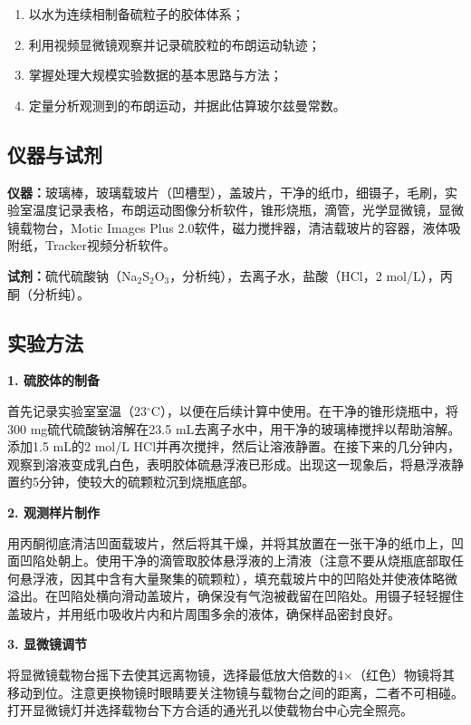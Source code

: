 \documentclass[a4paper]{article}
\begin{document}
\begin{enumerate}[label=\arabic*.,leftmargin=2em]
	\item 以水为连续相制备硫粒子的胶体体系；
	\item 利用视频显微镜观察并记录硫胶粒的布朗运动轨迹；
	\item 掌握处理大规模实验数据的基本思路与方法；
	\item 定量分析观测到的布朗运动，并据此估算玻尔兹曼常数。
\end{enumerate}

\subsection{仪器与试剂}

\textbf{仪器：}玻璃棒，玻璃载玻片（凹槽型），盖玻片，干净的纸巾，细镊子，毛刷，实验室温度记录表格，布朗运动图像分析软件，锥形烧瓶，滴管，光学显微镜，显微镜载物台，Motic Images Plus 2.0软件，磁力搅拌器，清洁载玻片的容器，液体吸附纸，Tracker视频分析软件。

\textbf{试剂：}硫代硫酸钠（Na$_2$S$_2$O$_3$，分析纯），去离子水，盐酸（HCl，2 mol/L），丙酮（分析纯）。

\subsection{实验方法}

\textbf{1. 硫胶体的制备}

首先记录实验室室温（23$^\circ$C），以便在后续计算中使用。在干净的锥形烧瓶中，将300 mg硫代硫酸钠溶解在23.5 mL去离子水中，用干净的玻璃棒搅拌以帮助溶解。添加1.5 mL的2 mol/L HCl并再次搅拌，然后让溶液静置。在接下来的几分钟内，观察到溶液变成乳白色，表明胶体硫悬浮液已形成。出现这一现象后，将悬浮液静置约5分钟，使较大的硫颗粒沉到烧瓶底部。

\textbf{2. 观测样片制作}

用丙酮彻底清洁凹面载玻片，然后将其干燥，并将其放置在一张干净的纸巾上，凹面凹陷处朝上。使用干净的滴管取胶体悬浮液的上清液（注意不要从烧瓶底部取任何悬浮液，因其中含有大量聚集的硫颗粒），填充载玻片中的凹陷处并使液体略微溢出。在凹陷处横向滑动盖玻片，确保没有气泡被截留在凹陷处。用镊子轻轻握住盖玻片，并用纸巾吸收片内和片周围多余的液体，确保样品密封良好。

\textbf{3. 显微镜调节}

将显微镜载物台摇下去使其远离物镜，选择最低放大倍数的4$\times$（红色）物镜将其移动到位。注意更换物镜时眼睛要关注物镜与载物台之间的距离，二者不可相碰。打开显微镜灯并选择载物台下方合适的通光孔以使载物台中心完全照亮。
\end{document}
